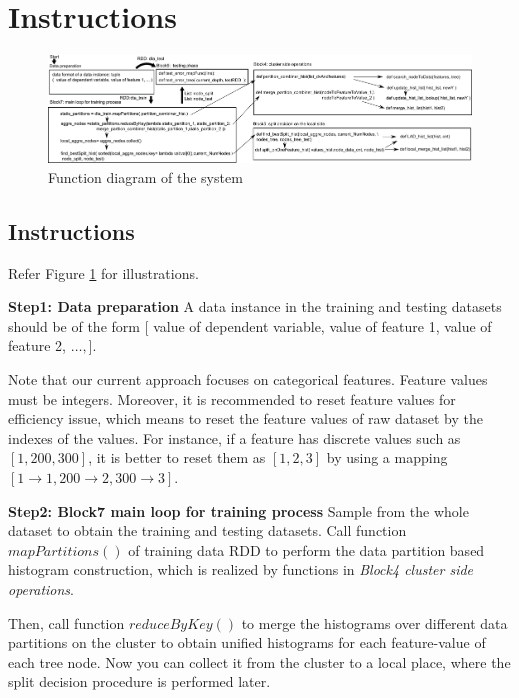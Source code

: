 \section{Instructions}

\begin{figure}[b]
   \centering	
   \includegraphics[width=1.95\columnwidth]{fig/design/block} 
    \caption{Function diagram of the system}
   \label{fig:design}
\end{figure}

\subsection{Instructions}

Refer Figure \ref{fig:design} for illustrations.

\textbf{Step1: Data preparation} A data instance in the training and
testing datasets should be of the form $[$ value of dependent variable, value of feature 1, value of feature 2, $\ldots, ]$.

Note that our current approach focuses on categorical features. Feature values must be integers.
Moreover, it is recommended to reset feature values for efficiency issue, which means to
reset the feature values of raw dataset by the indexes of the values. For instance, if a feature has discrete values
such as $[1,200,300]$, it is better to reset them as $[1,2,3]$ by using a mapping $[1 \rightarrow 1, 200 \rightarrow 2, 300 \rightarrow 3]$.
 

\textbf{Step2: Block7 main loop for training process}
Sample from the whole dataset to obtain the training and testing datasets.
Call function $mapPartitions()$ of training data RDD to perform the data partition based histogram construction,
which is realized by functions in \textit{Block4 cluster side operations}.

Then, call function $reduceByKey()$ to merge the histograms over different data partitions on the cluster
to obtain unified histograms for each feature-value of each tree node. Now you can collect it from the cluster 
to a local place, where the split decision procedure is performed later.


